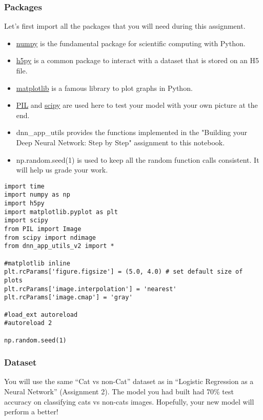 \subsubsection{Packages}

Let's first import all the packages that you will need during this assignment.
\begin{itemize}
\item \href{www.numpy.org}{numpy} is the fundamental package for scientific computing with Python.
\item \href{http://www.h5py.org}{h5py} is a common package to interact with a dataset that is stored on an H5 file.
\item \href{http://matplotlib.org}{matplotlib} is a famous library to plot graphs in Python.
\item \href{http://www.pythonware.com/products/pil/}{PIL} and \href{https://www.scipy.org/}{scipy} are used here to test your model with your own picture at the end.
\item dnn\_app\_utils provides the functions implemented in the "Building your Deep Neural Network: Step by Step" assignment to this notebook.
\item np.random.seed(1) is used to keep all the random function calls consistent. It will help us grade your work.
\end{itemize}


\begin{verbatim}
import time
import numpy as np
import h5py
import matplotlib.pyplot as plt
import scipy
from PIL import Image
from scipy import ndimage
from dnn_app_utils_v2 import *

#matplotlib inline
plt.rcParams['figure.figsize'] = (5.0, 4.0) # set default size of plots
plt.rcParams['image.interpolation'] = 'nearest'
plt.rcParams['image.cmap'] = 'gray'

#load_ext autoreload
#autoreload 2

np.random.seed(1)
\end{verbatim}





\subsubsection{Dataset}

You will use the same ``Cat vs non-Cat'' dataset as in ``Logistic Regression as a Neural Network'' (Assignment 2). The model you had built had 70\% test accuracy on classifying cats vs non-cats images. Hopefully, your new model will perform a better!

